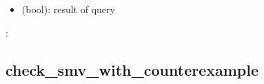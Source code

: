 \documentclass[letterpaper,10pt,english]{sphinxmanual}
\begin{document}
\begin{fulllineitems}
\begin{description}
\begin{itemize}
\end{itemize}

\item[{\sphinxstylestrong{returns}:}] \leavevmode\begin{itemize}
\item {} 
 (bool): result of query

\end{itemize}

\end{description}

:

\begin{sphinxVerbatim}[commandchars=\\\{\}]
\end{sphinxVerbatim}

\end{fulllineitems}



\subsection{check\_smv\_with\_counterexample}
\label{\detokenize{ModelChecking:id6}}\label{\detokenize{ModelChecking:check-smv-with-counterexample}}
\end{document}

